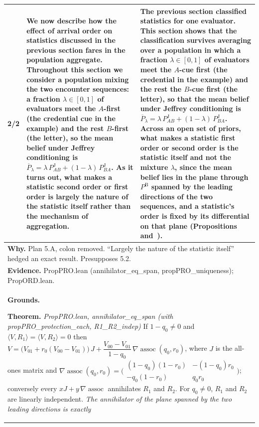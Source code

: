 \documentclass[10pt]{article}
\theoremstyle{definition}
\newcommand{\PB}{P^{\mathrm{B}}}
\newcommand{\PJ}{P^{\mathrm{J}}}
\newcommand{\Pbar}{\overline{P}}
\newcommand{\assoc}{\operatorname{assoc}}
\renewcommand{\ref}[1]{\textsc{\detokenize{#1}}}
\newlength{\fullw}\setlength{\fullw}{25.9cm}
\begin{document}
{\begin{longtable}{|p{0.9cm}|p{12.2cm}|p{12.2cm}|}
2/2 & We now describe how the effect of arrival order on statistics discussed in the previous section fares in the population aggregate. Throughout this section we consider a population mixing the two encounter sequences: a fraction $\lambda\in[0,1]$ of evaluators meet the $A$-first (the credential cue in the example) and the rest $B$-first (the letter), so the mean belief under Jeffrey conditioning is $\Pbar_\lambda=\lambda\,\PJ_{AB}+(1-\lambda)\,\PJ_{BA}$. As it turns out, what makes a statistic second order or first order is largely the nature of the statistic itself rather than the mechanism of aggregation. & The previous section classified statistics for one evaluator. This section shows that the classification survives averaging over a population in which a fraction $\lambda\in[0,1]$ of evaluators meet the $A$-cue first (the credential in the example) and the rest the $B$-cue first (the letter), so that the mean belief under Jeffrey conditioning is $\Pbar_\lambda=\lambda\,\PJ_{AB}+(1-\lambda)\,\PJ_{BA}$. Across an open set of priors, what makes a statistic first order or second order is the statistic itself and not the mixture $\lambda$, since the mean belief lies in the plane through $\PB$ spanned by the leading directions of the two sequences, and a statistic's order is fixed by its differential on that plane (Propositions~\ref{prop:ORD} and~\ref{prop:PRO}). \\ \hline
\multicolumn{3}{|p{\fullw}|}{\textbf{Why.} Plan 5.A, colon removed. ``Largely the nature of the statistic itself'' hedged an exact result. Presupposes 5.2.} \\
\multicolumn{3}{|p{\fullw}|}{\textbf{Evidence.} PropPRO.lean (annihilator\_eq\_span, propPRO\_uniqueness); PropORD.lean.} \\ \hline
\multicolumn{3}{|p{\fullw}|}{\textbf{Grounds.}\par \textbf{Theorem.} \textit{PropPRO.lean, annihilator\_eq\_span (with propPRO\_protection\_each, R1\_R2\_indep)} \newline If $1-q_0\neq0$ and $\langle V,R_1\rangle=\langle V,R_2\rangle=0$ then
$V=\bigl(V_{01}+r_0(V_{00}-V_{01})\bigr)\,J+\dfrac{V_{00}-V_{01}}{1-q_0}\,\nabla\!\assoc(q_0,r_0)$,
where $J$ is the all-ones matrix and
$\nabla\!\assoc(q_0,r_0)=\bigl(\begin{smallmatrix}(1-q_0)(1-r_0)&-(1-q_0)r_0\\-q_0(1-r_0)&q_0r_0\end{smallmatrix}\bigr)$;
conversely every $xJ+y\,\nabla\!\assoc$ annihilates $R_1$ and $R_2$. For $q_0\neq0$,
$R_1$ and $R_2$ are linearly independent. \newline \textit{The annihilator of the plane spanned by the two leading directions is exactly
}}
\end{longtable}}
\end{document}
